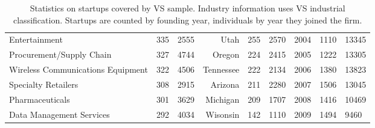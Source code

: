 \begin{table}[!htb]
\begin{tabular}{p{4.5cm}llrllrll}
  Entertainment & 335 & 2555 & Utah & 255 & 2570 & 2004 & 1110 & 13345 \\ 
  Procurement/Supply Chain & 327 & 4744 & Oregon & 224 & 2415 & 2005 & 1222 & 13305 \\ 
  Wireless Communications Equipment & 322 & 4506 & Tennessee & 222 & 2134 & 2006 & 1380 & 13823 \\ 
  Specialty Retailers & 308 & 2915 & Arizona & 211 & 2280 & 2007 & 1506 & 13045 \\ 
  Pharmaceuticals & 301 & 3629 & Michigan & 209 & 1707 & 2008 & 1416 & 10469 \\ 
  Data Management Services & 292 & 4034 & Wisonsin & 142 & 1110 & 2009 & 1494 & 9460 \\ 
   \bottomrule
\end{tabular}
\endgroup
\caption{Statistics on startups covered by VS sample. Industry information uses VS industrial classification. Startups are counted by founding year, individuals by year they joined the firm.} 
\label{table:VS_summaryTable}
\end{table}
